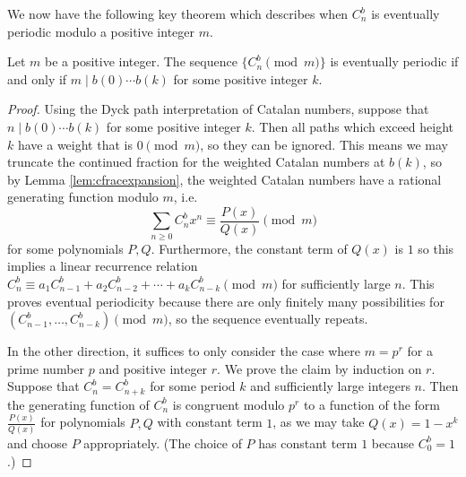 We now have the following key theorem which describes when $C^b_n$ is eventually periodic modulo a positive integer $m$.
\begin{theorem}
\label{thm:periodicity}
Let $m$ be a positive integer. The sequence $\{C^b_n\pmod{m}\}$ is eventually periodic if and only if $m\mid b(0)\dotsm b(k)$ for some positive integer $k$.
\end{theorem}
\begin{proof}
    Using the Dyck path interpretation of Catalan numbers, suppose that $n\mid b(0)\dotsm b(k)$ for some positive integer $k$. Then all paths which exceed height $k$ have a weight that is $0\pmod{m}$, so they can be ignored. This means we may truncate the continued fraction for the weighted Catalan numbers at $b(k)$, so by Lemma \ref{lem:cfracexpansion}, the weighted Catalan numbers have a rational generating function modulo $m$, i.e.
    \[\sum_{n\geq 0}C^b_nx^n\equiv \frac{P(x)}{Q(x)}\pmod{m}\]
    for some polynomials $P, Q$. Furthermore, the constant term of $Q(x)$ is $1$ so this implies a linear recurrence relation $C^b_n\equiv a_1C^b_{n-1}+a_2C^b_{n-2}+\dotsb+a_kC^b_{n-k}\pmod{m}$ for sufficiently large $n$. This proves eventual periodicity because there are only finitely many possibilities for $(C^b_{n-1}, \dotsc, C^b_{n-k})\pmod{m}$, so the sequence eventually repeats.
    
    In the other direction, it suffices to only consider the case where $m=p^r$ for a prime number $p$ and positive integer $r$. We prove the claim by induction on $r$. Suppose that $C^b_n=C^b_{n+k}$ for some period $k$ and sufficiently large integers $n$. Then the generating function of $C^b_n$ is congruent modulo $p^r$ to a function of the form $\frac{P(x)}{Q(x)}$ for polynomials $P, Q$ with constant term $1$, as we may take $Q(x)=1-x^k$ and choose $P$ appropriately. (The choice of $P$ has constant term $1$ because $C^b_0=1$.)
    

\end{proof}
